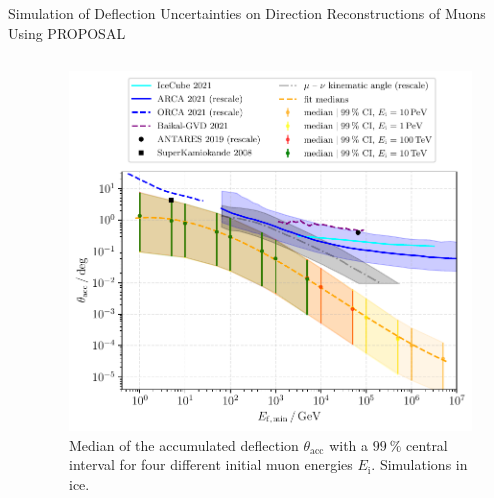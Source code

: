 \documentclass[t]{beamer}
\begin{document}
\begin{columns}[onlytextwidth]
\begin{column}{\textwidth}
\begin{block}[equal height group=J]{Simulation of Deflection Uncertainties on Direction Reconstructions of Muons Using PROPOSAL}
\begin{columns}[onlytextwidth]
\begin{column}{0.33\textwidth}


           \end{column}
          \begin{column}{0.33\textwidth}
            \begin{figure}
              \includegraphics[width=0.9\linewidth, height=.4\textheight, keepaspectratio]{plots/fit_median_defl_cut_10percent_only_poly_new_resolution_rescale_no_icecube_paper_final_all.pdf}
              \caption*{Median of the accumulated deflection $\theta_\text{acc}$ with a $\SI{99}{\percent}$ central interval for four different initial muon energies $E_\text{i}$. Simulations in ice.}
            \end{figure}
          \end{column}
      \end{columns}



    \end{block}
    \end{column}%
  \end{columns}%
\end{document}
